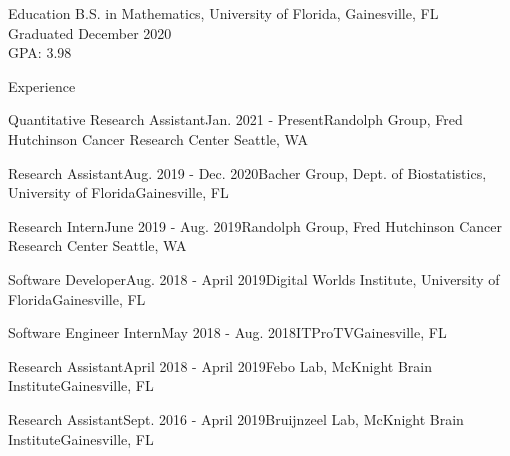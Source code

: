 \documentclass{resume}
\begin{document}
 
 
\begin{rSection}{Education} 
B.S. in Mathematics, University of Florida, Gainesville, FL \\
Graduated December 2020 \\
GPA: 3.98

\end{rSection}


\begin{rSection}{Experience}

\begin{rSubsectionEmpty}{Quantitative Research Assistant}{Jan. 2021 - Present}{Randolph
    Group, Fred Hutchinson Cancer Research Center}
{Seattle, WA}
\end{rSubsectionEmpty}

\begin{rSubsectionEmpty}{Research Assistant}{Aug. 2019 - Dec. 2020}{Bacher Group, Dept. of
Biostatistics, University of Florida}{Gainesville, FL}
\end{rSubsectionEmpty}

\begin{rSubsectionEmpty}{Research Intern}{June 2019 - Aug. 2019}{Randolph
    Group, Fred Hutchinson Cancer Research Center}
{Seattle, WA}
\end{rSubsectionEmpty}

\begin{rSubsectionEmpty}{Software Developer}{Aug. 2018 - April 2019}{Digital Worlds Institute, University of Florida}{Gainesville, FL}
\end{rSubsectionEmpty}

\begin{rSubsectionEmpty}{Software Engineer Intern}{May 2018 - Aug. 2018}{ITProTV}{Gainesville, FL}
\end{rSubsectionEmpty} 

\begin{rSubsectionEmpty}{Research Assistant}{April 2018 - April 2019}{Febo Lab, McKnight Brain Institute}{Gainesville, FL}
\end{rSubsectionEmpty}

\begin{rSubsectionEmpty}{Research Assistant}{Sept. 2016 - April 2019}{Bruijnzeel Lab, McKnight Brain Institute}{Gainesville, FL}
     \end{rSubsectionEmpty}
     
\end{rSection}
\end{document}
